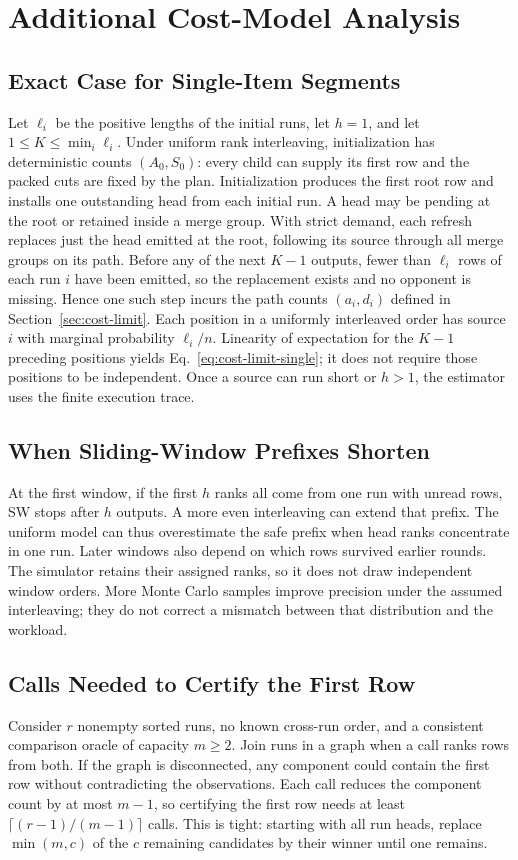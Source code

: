 \section{Additional Cost-Model Analysis}
\label{app:cost-results}

\subsection{Exact Case for Single-Item Segments}

Let $\ell_i$ be the positive lengths of the initial runs, let $h=1$, and let $1\le K\le\min_i\ell_i$. Under uniform rank interleaving, initialization has deterministic counts $(A_0,S_0)$: every child can supply its first row and the packed cuts are fixed by the plan. Initialization produces the first root row and installs one outstanding head from each initial run. A head may be pending at the root or retained inside a merge group. With strict demand, each refresh replaces just the head emitted at the root, following its source through all merge groups on its path. Before any of the next $K-1$ outputs, fewer than $\ell_i$ rows of each run $i$ have been emitted, so the replacement exists and no opponent is missing. Hence one such step incurs the path counts $(a_i,d_i)$ defined in Section~\ref{sec:cost-limit}. Each position in a uniformly interleaved order has source $i$ with marginal probability $\ell_i/n$. Linearity of expectation for the $K-1$ preceding positions yields Eq.~\eqref{eq:cost-limit-single}; it does not require those positions to be independent. Once a source can run short or $h>1$, the estimator uses the finite execution trace.

\subsection{When Sliding-Window Prefixes Shorten}

At the first window, if the first $h$ ranks all come from one run with unread rows, SW stops after $h$ outputs. A more even interleaving can extend that prefix. The uniform model can thus overestimate the safe prefix when head ranks concentrate in one run. Later windows also depend on which rows survived earlier rounds. The simulator retains their assigned ranks, so it does not draw independent window orders. More Monte Carlo samples improve precision under the assumed interleaving; they do not correct a mismatch between that distribution and the workload.

\subsection{Calls Needed to Certify the First Row}

Consider $r$ nonempty sorted runs, no known cross-run order, and a consistent comparison oracle of capacity $m\ge2$. Join runs in a graph when a call ranks rows from both. If the graph is disconnected, any component could contain the first row without contradicting the observations. Each call reduces the component count by at most $m-1$, so certifying the first row needs at least $\lceil(r-1)/(m-1)\rceil$ calls. This is tight: starting with all run heads, replace $\min(m,c)$ of the $c$ remaining candidates by their winner until one remains.
